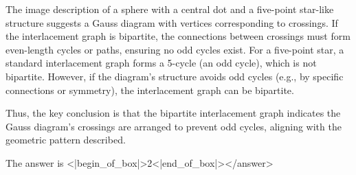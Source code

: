 The image description of a sphere with a central dot and a five-point star-like structure suggests a Gauss diagram with vertices corresponding to crossings. If the interlacement graph is bipartite, the connections between crossings must form even-length cycles or paths, ensuring no odd cycles exist. For a five-point star, a standard interlacement graph forms a 5-cycle (an odd cycle), which is not bipartite. However, if the diagram’s structure avoids odd cycles (e.g., by specific connections or symmetry), the interlacement graph can be bipartite.  

Thus, the key conclusion is that the bipartite interlacement graph indicates the Gauss diagram’s crossings are arranged to prevent odd cycles, aligning with the geometric pattern described.  

The answer is <|begin_of_box|>2<|end_of_box|></answer>